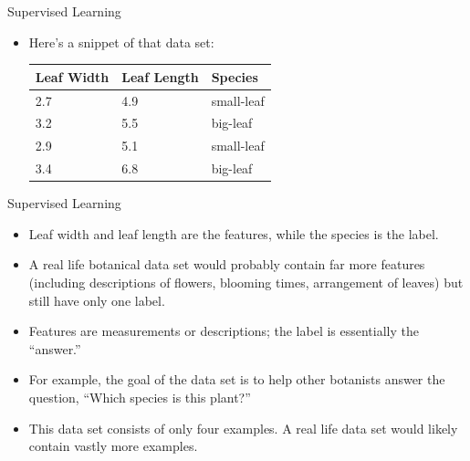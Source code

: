 \documentclass{beamer}
\begin{document}

\begin{frame}{Supervised Learning}

\begin{itemize}
\item Here's a snippet of that data set:

\bigskip
\begin{tabular}{lll}
Leaf Width & Leaf Length & Species \\ \hline
2.7	& 4.9 & small-leaf \\
3.2	& 5.5 & big-leaf \\
2.9	& 5.1 & small-leaf \\
3.4	& 6.8 & big-leaf 
\end{tabular}

\end{itemize}

\end{frame}


\begin{frame}{Supervised Learning}

\begin{itemize}

\item Leaf width and leaf length are the features, while the species is the label. 

\item A real life botanical data set would probably contain far more features (including descriptions of flowers, blooming times, arrangement of leaves) but still have only one label. 

\item Features are measurements or descriptions; the label is essentially the ``answer.'' 

\item For example, the goal of the data set is to help other botanists answer the question, ``Which species is this plant?''

\item This data set consists of only four examples. A real life data set would likely contain vastly more examples.

\end{itemize}

\end{frame}

\end{document}
